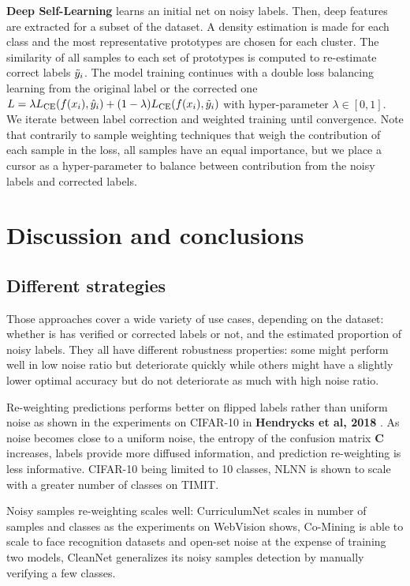 \textbf{Deep Self-Learning} \citep{SelfLearning} learns an initial net on noisy labels. Then, deep features are extracted for a subset of the dataset. A density estimation is made for each class and the most representative prototypes are chosen for each cluster. The similarity of all samples to each set of prototypes is computed to re-estimate correct labels $\Tilde{y}_i$. The model training continues with a double loss balancing learning from the original label or the corrected one $L=\lambda L_\text{CE}(f(x_i), \hat{y}_i) + (1-\lambda)L_\text{CE}(f(x_i), \Tilde{y}_i)$ with hyper-parameter $\lambda \in [0,1]$. We iterate between label correction and weighted training until convergence. Note that contrarily to sample weighting techniques that weigh the contribution of each sample in the loss, all samples have an equal importance, but we place a cursor as a hyper-parameter to balance between contribution from the noisy labels and corrected labels.

\section{Discussion and conclusions}
\subsection{Different strategies} %

Those approaches cover a wide variety of use cases, depending on the dataset: whether is has verified or corrected labels or not, and the estimated proportion of noisy labels. They all have different robustness properties: some might perform well in low noise ratio but deteriorate quickly while others might have a slightly lower optimal accuracy but do not deteriorate as much with high noise ratio.

Re-weighting predictions performs better on flipped labels rather than uniform noise as shown in the experiments on CIFAR-10 in \textbf{Hendrycks et al, 2018} \citep{Trusted}. As noise becomes close to a uniform noise, the entropy of the confusion matrix $\textbf{C}$ increases, labels provide more diffused information, and prediction re-weighting is less informative. CIFAR-10 being limited to 10 classes, NLNN \citep{NLNN} is shown to scale with a greater number of classes on TIMIT.

Noisy samples re-weighting scales well: CurriculumNet \citep{CurriculumNet} scales in number of samples and classes as the experiments on WebVision shows, Co-Mining \citep{CoMining} is able to scale to face recognition datasets and open-set noise at the expense of training two models, CleanNet generalizes its noisy samples detection by manually verifying a few classes.

